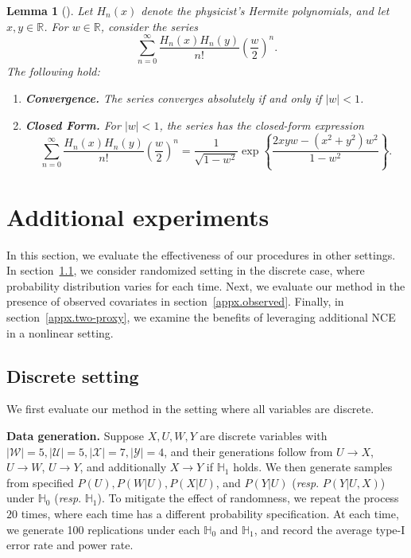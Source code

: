 \documentclass[
  12pt]{article}
\newtheorem{lemma}{Lemma}
\def\to{\rightarrow}
\def\mH{\mathbb{H}}
\def\cU{\mathcal{U}}
\def\cW{\mathcal{W}}
\def\cX{\mathcal{X}}
\def\cY{\mathcal{Y}}
\begin{document}
\begin{lemma}[\cite{nevai2006orthogonal}]\label{lem:mehler_physicist}
Let $ H_n(x) $ denote the physicist's Hermite polynomials, and let $ x, y \in \mathbb{R} $. For $ w \in \mathbb{R}$, consider the series
$$
\sum_{n=0}^\infty \frac{H_n(x) H_n(y)}{n!} \left( \frac{w}{2} \right)^n.
$$
The following hold:
\begin{enumerate}
    \item \textbf{Convergence.} The series converges absolutely if and only if $ |w| < 1 $.
    \item \textbf{Closed Form.} For $ |w| < 1 $, the series has the closed-form expression
    $$
    \sum_{n=0}^\infty \frac{H_n(x) H_n(y)}{n!} \left( \frac{w}{2} \right)^n = \frac{1}{\sqrt{1 - w^2}} \exp \left\{ \frac{2xy w - (x^2 + y^2) w^2}{1 - w^2} \right\}.
    $$
\end{enumerate}
\end{lemma}
\section{Additional experiments}
\label{appx.add_experiment}
In this section, we evaluate the effectiveness of our procedures in other settings. In section~\ref{appx.discrete}, we consider randomized setting in the discrete case, where probability distribution varies for each time. Next, we evaluate our method in the presence of observed covariates in section~\ref {appx.observed}. 
Finally, in section~\ref{appx.two-proxy}, we examine the benefits of leveraging additional NCE in a nonlinear setting. 





\subsection{Discrete setting}
\label{appx.discrete}
We first evaluate our method in the setting where all variables are discrete. 

\textbf{Data generation.} Suppose $X,U,W,Y$ are discrete variables with $|\cW|=5,|\cU|=5,|\cX|=7,|\cY|=4$, and their generations follow from $U \to X$, $U \to W$, $U \to Y$, and additionally $X \to Y$ if $\mH_1$ holds. We then generate samples from specified $P(U), P(W|U), P(X|U)$, and $P(Y|U)$ (\emph{resp}. $P(Y|U,X)$) under $\mH_0$ (\emph{resp}. $\mH_1$). To mitigate the effect of randomness, we repeat the process $20$ times, where each time has a different probability specification. At each time, we generate 100 replications under each $\mathbb{H}_0$ and $\mathbb{H}_1$, and record the average type-I error rate and power rate.
\end{document}
